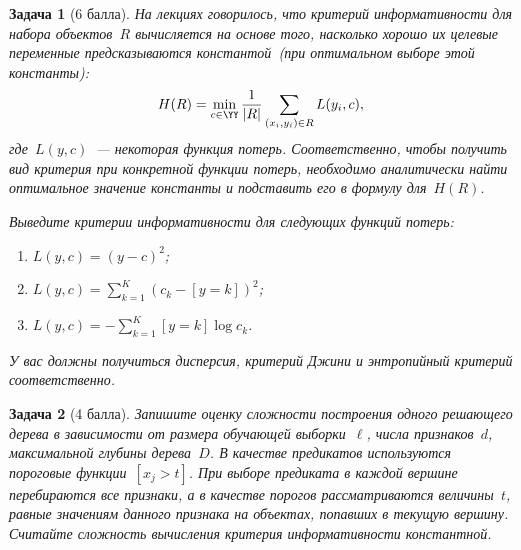 \documentclass[12pt,fleqn]{article}
\newtheorem{esProblem}{Задача}
\begin{document}
\begin{esProblem}[6 балла]
    На лекциях говорилось, что критерий информативности для набора объектов~$R$ вычисляется на основе того,
    насколько хорошо их целевые переменные предсказываются константой~(при оптимальном выборе этой константы):
    \[
        H(R)
        =
        \min_{c \in \YY}
        \frac{1}{|R|}
        \sum_{(x_i, y_i) \in R}
            L(y_i, c),
    \]
    где~$L(y, c)$~--- некоторая функция потерь.
    Соответственно, чтобы получить вид критерия при конкретной функции потерь, необходимо аналитически
    найти оптимальное значение константы и подставить его в формулу для~$H(R)$.

    Выведите критерии информативности для следующих функций потерь:
    \begin{enumerate}
        \item $L(y, c) = (y - c)^2$;
        \item $L(y, c) = \sum_{k = 1}^{K} (c_k - [y = k])^2$;
        \item $L(y, c) = -\sum_{k = 1}^{K} [y = k] \log c_k$.
    \end{enumerate}
    У вас должны получиться дисперсия, критерий Джини и энтропийный критерий соответственно.
\end{esProblem}

\begin{esProblem}[4 балла]
    Запишите оценку сложности построения одного решающего дерева в зависимости
    от размера обучающей выборки~$\ell$, числа признаков~$d$, максимальной глубины дерева~$D$.
    В качестве предикатов используются пороговые функции~$[x_j > t]$.
    При выборе предиката в каждой вершине перебираются все признаки,
    а в качестве порогов рассматриваются величины~$t$, равные значениям данного признака
    на объектах, попавших в текущую вершину.
    Считайте сложность вычисления критерия информативности константной.
\end{esProblem}
\end{document}
